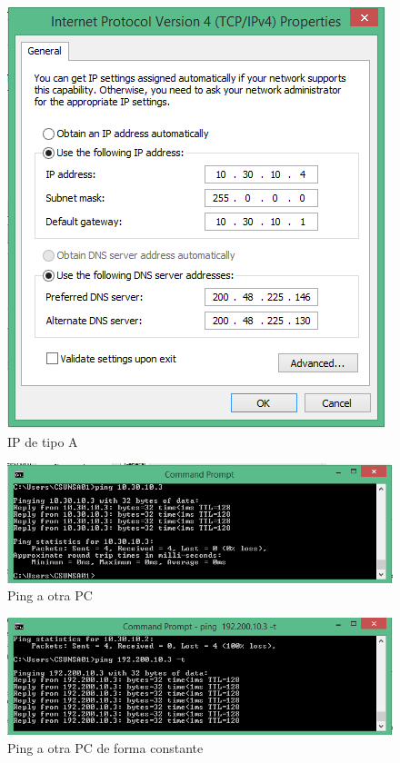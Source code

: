 \documentclass[a4paper,12pt]{article}
\begin{document}
 \begin{figure}[H]
  \centering
  \includegraphics[scale = 0.5]{15.png}
  \caption{IP de tipo A}
 \end{figure}
 
 \begin{figure}[H]
  \centering
  \includegraphics[scale = 0.5]{16.png}
  \caption{Ping a otra PC}
 \end{figure}
 
 \begin{figure}[H]
  \centering
  \includegraphics[scale = 0.5]{17.png}
  \caption{Ping a otra PC de forma constante}
 \end{figure}
 
\end{document}
